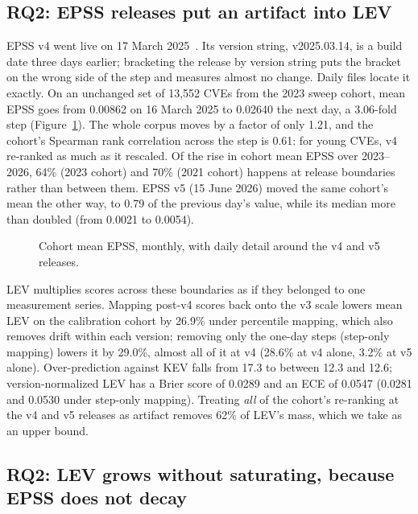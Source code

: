 \subsection{RQ2: EPSS releases put an artifact into LEV}\label{sec:res-version}

EPSS v4 went live on 17 March 2025~\cite{epss2026releases}. Its version string,
v2025.03.14, is a build date three days earlier; bracketing the release by
version string puts the bracket on the wrong side of the step and measures
almost no change. Daily files locate
it exactly. On an unchanged set of 13,552 CVEs from the 2023 sweep cohort, mean
EPSS goes from 0.00862 on 16 March 2025 to 0.02640 the next day, a 3.06-fold
step (Figure~\ref{fig:drift}). The whole corpus moves by a factor of only 1.21,
and the cohort's Spearman rank correlation across the step is 0.61: for young
CVEs, v4 re-ranked as much as it rescaled. Of the rise in cohort mean EPSS over
2023--2026, 64\% (2023 cohort) and 70\% (2021 cohort) happens at release
boundaries rather than between them. EPSS v5 (15 June 2026) moved the same
cohort's mean the other way, to 0.79 of the previous day's value, while its
median more than doubled (from 0.0021 to 0.0054).

\begin{figure}[t]
\centering
{}
\caption{Cohort mean EPSS, monthly, with daily detail around the v4 and v5
releases.}\label{fig:drift}
\end{figure}

LEV multiplies scores across these boundaries as if they belonged to one
measurement series. Mapping post-v4 scores back onto the v3 scale lowers mean
LEV on the calibration cohort by 26.9\% under percentile mapping, which also
removes drift within each version; removing only the one-day steps (step-only
mapping) lowers it by 29.0\%, almost all of it at v4 (28.6\% at v4 alone,
3.2\% at v5 alone). Over-prediction against KEV falls from 17.3 to between 12.3
and 12.6; version-normalized LEV has a Brier score of 0.0289 and an ECE of
0.0547 (0.0281 and 0.0530 under step-only mapping). Treating \emph{all} of the cohort's re-ranking at the v4 and v5
releases as artifact
removes 62\% of LEV's mass, which we take as an upper bound.


\subsection{RQ2: LEV grows without saturating, because EPSS does not decay}\label{sec:res-growth}


